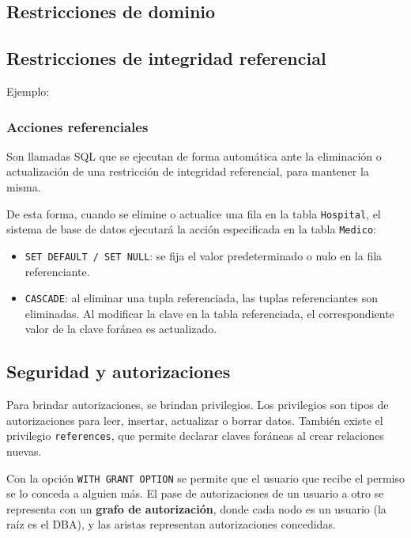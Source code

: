 \documentclass[a4paper, twoside]{article}
\newcommand{\codedir}{../resources/code} %
\begin{document}
\subsection{Restricciones de dominio}


\subsection{Restricciones de integridad referencial}
Ejemplo: 


\subsubsection{Acciones referenciales}
Son llamadas SQL que se ejecutan de forma automática ante la eliminación o actualización de una restricción de integridad referencial, para mantener la misma.



De esta forma, cuando se elimine o actualice una fila en la tabla \texttt{Hospital}, el sistema de base de datos ejecutará la acción especificada en la tabla \texttt{Medico}:
\begin{itemize}
	\item \texttt{SET DEFAULT / SET NULL}: se fija el valor predeterminado o nulo en la fila referenciante.
	\item \texttt{CASCADE}: al eliminar una tupla referenciada, las tuplas referenciantes son eliminadas. Al modificar la clave en la tabla referenciada, el correspondiente valor de la clave foránea es actualizado.
\end{itemize}

\subsection{Seguridad y autorizaciones}
Para brindar autorizaciones, se brindan privilegios. Los privilegios son tipos de autorizaciones para leer, insertar, actualizar o borrar datos. También existe el privilegio \texttt{references}, que permite declarar claves foráneas al crear relaciones nuevas.

Con la opción \texttt{WITH GRANT OPTION} se permite que el usuario que recibe el permiso se lo conceda a alguien más. El pase de autorizaciones de un usuario a otro se representa con un \textbf{grafo de autorización}, donde cada nodo es un usuario (la raíz es el DBA), y las aristas representan autorizaciones concedidas.
\end{document}
